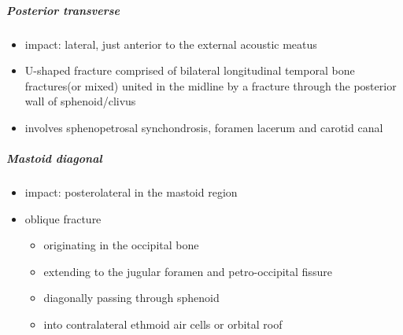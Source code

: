 \subparagraph{Posterior transverse}

\begin{itemize}
	\item
	impact: lateral, just anterior to the external acoustic meatus
	\item
	U-shaped fracture comprised of bilateral longitudinal temporal bone fractures(or mixed) united in the midline by a fracture through the posterior wall of sphenoid/clivus
	\item
	involves sphenopetrosal synchondrosis, foramen lacerum and carotid canal
\end{itemize}


\subparagraph{Mastoid diagonal}

\begin{itemize}
	\item
	impact: posterolateral in the mastoid region
	\item
	oblique fracture
	
	\begin{itemize}
		\item
		originating in the occipital bone
		\item
		extending to the jugular foramen and petro-occipital fissure
		\item
		diagonally passing through sphenoid
		\item
		into contralateral ethmoid air cells or orbital roof
	\end{itemize}
\end{itemize}
